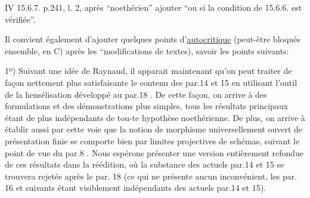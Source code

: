 



IV 15.6.7. p.241, l. 2, après ``noethérien'' ajouter ``ou si la condition
de 15.6.6. est vérifiée''.

Il convient également d'ajouter quelques points d'\uline{autocritique} (peut-être bloqués ensemble, en C) après les ``modifications de textes), savoir les points suivants:

1º) Suivant une idée de Raynaud, il apparait maintenant qu'on peut traiter de façon nettement plus satisfaisante le contenu des par.14 et 15 en utilisant l'outil de la hensélisation développé au par.18 . De cette façon, on arrive à des formulations et des démonstrations plus simples, tous les résultats principaux étant de plus indépendants de tou-te hypothèse noethérienne. De plus, on arrive à établir aussi par cette voie que la notion de morphisme universellement ouvert  de présentation finie se comporte bien par limites projectives de schémas, suivant le point de vue du par.8 . Nous espérons présenter une version entièrement refondue de ces résultats dans la réédition, où  la substance des actuels par.14 et 15 se trouvera rejetée après le par. 18 (ce qui ne présente aucun inconvénient, les par. 16 et suivants étant visiblement indépendants des actuels par.14 et 15).

